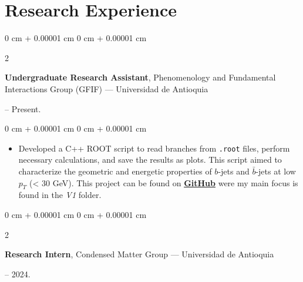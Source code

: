 \documentclass[10pt, letterpaper]{article}
\newenvironment{highlights}{
    \begin{itemize}[
        topsep=0.10 cm,
        parsep=0.10 cm,
        partopsep=0pt,
        itemsep=0pt,
        leftmargin=0 cm + 10pt
    ]
}{
    \end{itemize}
}
\newenvironment{onecolentry}{
    \begin{adjustwidth}{
        0 cm + 0.00001 cm
    }{
        0 cm + 0.00001 cm
    }
}{
    \end{adjustwidth}
}
\newenvironment{twocolentry}[2][]{
    \onecolentry
    \def\secondColumn{#2}
    \setcolumnwidth{\fill, 4.5 cm}
    \begin{paracol}{2}
}{
    \switchcolumn \raggedleft \secondColumn
    \end{paracol}
    \endonecolentry
}
\begin{document}
    \section{Research Experience}
    \begin{twocolentry}{
        2024 – Present.
    }
        \textbf{Undergraduate Research Assistant}, Phenomenology and Fundamental Interactions Group (GFIF) --- Universidad de Antioquia
    \end{twocolentry}

    \vspace{0.10 cm}
    \begin{onecolentry}
        \begin{highlights}
            \item Developed a C++ ROOT script to read branches from \texttt{.root} files, perform necessary calculations, and save the results as plots. This script aimed to characterize the geometric and energetic properties of \(b\)-jets and \(\bar{b}\)-jets at low \(p_T\) (< 30 GeV). This project can be found on \href{https://github.com/JuanJ27/Btagginghep}{\textbf{GitHub}} were my main focus is found in the \textit{V1} folder.
        \end{highlights}
    \end{onecolentry}

    \vspace{0.2 cm}
    \begin{twocolentry}{
        2023 – 2024.
    }
        \textbf{Research Intern}, Condensed Matter Group --- Universidad de Antioquia
    \end{twocolentry}
\end{document}
